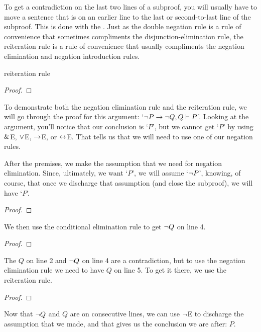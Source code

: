 To get a contradiction on the last two lines of a subproof, you will usually have to move a sentence that is on an earlier line to the last or second-to-last line of the subproof. This is done with the . Just as the double negation rule is a rule of convenience that sometimes compliments the disjunction-elimination rule, the reiteration rule is a rule of convenience that usually compliments the negation elimination and negation introduction rules.  

\begin{factboxy-width}[width=7.5cm]{reiteration rule}
\begin{proof}
	 
\end{proof}
\end{factboxy-width}

To demonstrate both the negation elimination rule and the reiteration rule, we will go through the proof for this argument: `${\neg} P \rightarrow {\neg} Q, Q \vdash P$'. Looking at the argument, you'll notice that our conclusion is `$P$', but we cannot get `$P$' by using $\mathbin{\&}$E, $\vee$E, $\rightarrow$E, or $\leftrightarrow$E. That tells us that we will need to use one of our negation rules.

After the premises, we make the assumption that we need for negation elimination. Since, ultimately, we want `$P$', we will assume `${\neg} P$', knowing, of course, that once we discharge that assumption (and close the subproof), we will have `$P$'.

\begin{proof}
	 \pr{}	
	 \pr{}
	\open
		\as{}
\end{proof}
We then use the conditional elimination rule to get ${\neg} Q$ on line 4. 
\begin{proof}
	 \pr{}	
	 \pr{}
	\open
		\as{}
\end{proof}
The $Q$ on line 2 and ${\neg} Q$ on line 4 are a contradiction, but to use the negation elimination rule we need to have $Q$ on line 5. To get it there, we use the reiteration rule. 

\begin{proof}
	 \pr{}	
	 \pr{}
	\open
		\as{}
\end{proof}
Now that ${\neg} Q$ and $Q$ are on consecutive lines, we can use ${\neg}$E to discharge the assumption that we made, and that gives us the conclusion we are after: $P$.

